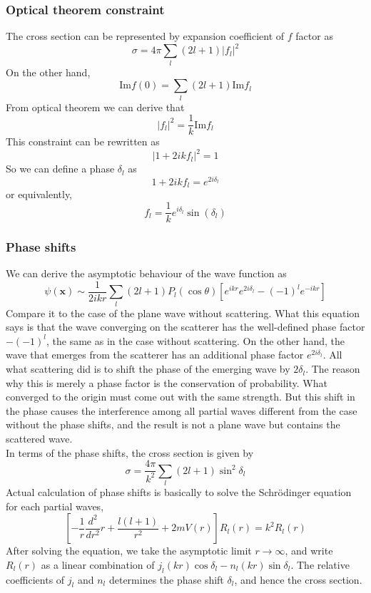 \documentclass[cyan]{elegantnote}
\begin{document}
\subsubsection{Optical theorem constraint}
\noindent
The cross section can be represented by expansion coefficient of $f$ factor as
\[\sigma = 4\pi \sum_l (2l+1)|f_l|^2\]
On the other hand, 
\[\mathrm{Im} f(0) = \sum_l (2l+1) \mathrm{Im} f_l\]
From optical theorem we can derive that
\[|f_l|^2 = \frac{1}{k} \mathrm{Im} f_l\]
This constraint can be rewritten as
\[|1+2ikf_l|^2 = 1\]
So we can define a phase $\delta_l$ as 
\[1+2ikf_l = e^{2i\delta_l}\]
or equivalently,
\[f_l = \frac{1}{k} e^{i\delta_l} \sin(\delta_l)\]

\subsubsection{Phase shifts}
\noindent
We can derive the asymptotic behaviour of the wave function as
\[\psi(\bm{x}) \sim \frac{1}{2ikr} \sum_{l} (2l+1)P_l(\cos \theta) [e^{ikr}e^{2i\delta_l} - (-1)^l e^{-ikr}]\]
Compare it to the case of the plane wave without scattering. What this equation says is that the wave converging on the scatterer
has the well-defined phase factor $-(-1)^l$, the same as in the case without scattering. On the other hand, the wave that emerges from the scatterer has an additional phase factor $e^{2i\delta_l}$. All what scattering did is to shift the phase of the emerging wave by $2\delta_l$. The reason why this is merely a phase factor is
the conservation of probability. What converged to the origin must come out with the same strength. But this shift in the phase causes the interference among all partial waves different from the case without the phase shifts, and the result is not a plane wave but contains the scattered wave.\\
In terms of the phase shifts, the cross section is given by
\[\sigma = \frac{4\pi}{k^2} \sum_l (2l+1) \sin^2\delta_l\]
Actual calculation of phase shifts is basically to solve the Schr\"{o}dinger equation for each partial waves,
\[\left[-\frac{1}{r}\frac{d^2}{dr^2}r+\frac{l(l+1)}{r^2}+2mV(r)\right]R_l(r) = k^2 R_l(r)\]
After solving the equation, we take the asymptotic limit $r \to \infty$, and write $R_l(r)$ as a linear combination of $j_l(kr)\cos \delta_l - n_l(kr) \sin \delta_l $. The relative coefficients of $j_l$ and $n_l$ determines the phase shift $\delta_l$, and hence the cross section.
\end{document}
